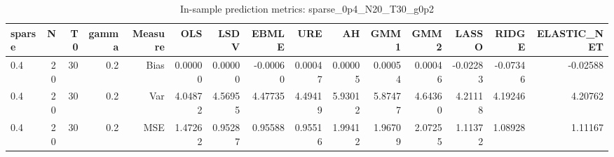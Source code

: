 \begin{table}[!htbp]\centering
\caption{In-sample prediction metrics: sparse_0p4_N20_T30_g0p2}
\label{tab:table2_sparse_0p4_N20_T30_g0p2}
\begin{tabular}{lrrrrrrrrrrrrrr}
\hline
sparse & N & T0 & gamma & Measure & OLS & LSDV & EBMLE & URE & AH & GMM1 & GMM2 & LASSO & RIDGE & ELASTIC_NET \\
\hline
0.4 & 20 & 30 & 0.2 & Bias & 0.00000 & 0.00000 & -0.00060 & 0.00047 & 0.00005 & 0.00054 & 0.00046 & -0.02283 & -0.07346 & -0.02588 \\
0.4 & 20 & 30 & 0.2 & Var & 4.04872 & 4.56955 & 4.47735 & 4.49419 & 5.93012 & 5.87477 & 4.64360 & 4.21118 & 4.19246 & 4.20762 \\
0.4 & 20 & 30 & 0.2 & MSE & 1.47262 & 0.95287 & 0.95588 & 0.95516 & 1.99412 & 1.96709 & 2.07255 & 1.11372 & 1.08928 & 1.11167 \\
\hline
\end{tabular}
\end{table}

